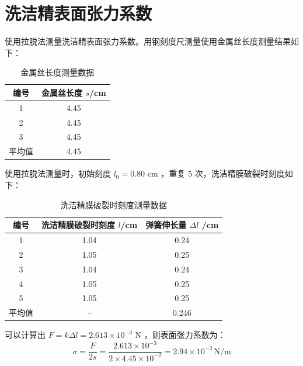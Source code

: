 \documentclass[a4paper]{extarticle}
\begin{document}
    \section{洗洁精表面张力系数}
    使用拉脱法测量洗洁精表面张力系数。用钢刻度尺测量使用金属丝长度测量结果如下：
    \begin{table}[H]
        \centering
        \caption{金属丝长度测量数据}
        \begin{tabular}{cc}
            \toprule
            编号 & 金属丝长度 $s$/cm\\
            \midrule
            1 & 4.45\\
            2 & 4.45\\
            3 & 4.45\\
            \midrule
            平均值 & 4.45\\
            \bottomrule
        \end{tabular}
    \end{table}
    使用拉脱法测量时，初始刻度 $l_0 = 0.80$ cm ，重复 5 次，洗洁精膜破裂时刻度如下：
    \begin{table}[H]
        \centering
        \caption{洗洁精膜破裂时刻度测量数据}
        \begin{tabular}{ccc}
            \toprule
            编号 & 洗洁精膜破裂时刻度 $l$/cm & 弹簧伸长量 $\Delta l$ /cm\\
            \midrule
            1 & 1.04 & 0.24\\
            2 & 1.05 & 0.25\\
            3 & 1.04 & 0.24\\
            4 & 1.05 & 0.25\\
            5 & 1.05 & 0.25\\
            \midrule
            平均值 & -- & 0.246\\
            \bottomrule
        \end{tabular}
    \end{table}
    可以计算出 $F=k\Delta l=2.613\times10^{-3}$ N ，则表面张力系数为：
    \begin{equation*}
        \sigma=\frac{F}{2s}=\frac{2.613\times10^{-3}}{2\times4.45\times10^{-2}}=2.94\times10^{-2} \,\text{N/m}
    \end{equation*}
\end{document}
